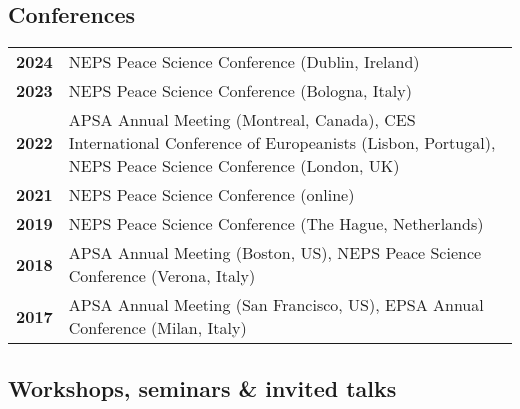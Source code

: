 \documentclass[a4paper, 12pt]{article}
\begin{document}
\subsection*{Conferences}


\begin{tabular}{lp{15cm}}
\textbf{2024} & NEPS Peace Science Conference (Dublin, Ireland) \\
\textbf{2023} & NEPS Peace Science Conference (Bologna, Italy) \\
\textbf{2022} & APSA Annual Meeting (Montreal, Canada), CES International Conference of Europeanists (Lisbon, Portugal), NEPS Peace Science Conference (London, UK) \\
\textbf{2021} & NEPS Peace Science Conference (online) \\
\textbf{2019} & NEPS Peace Science Conference (The Hague, Netherlands) \\
\textbf{2018} & APSA Annual Meeting (Boston, US), NEPS Peace Science Conference (Verona, Italy) \\
\textbf{2017} & APSA Annual Meeting (San Francisco, US), EPSA Annual Conference (Milan, Italy) \\
\end{tabular}



\subsection*{Workshops, seminars \& invited talks}

\end{document}
